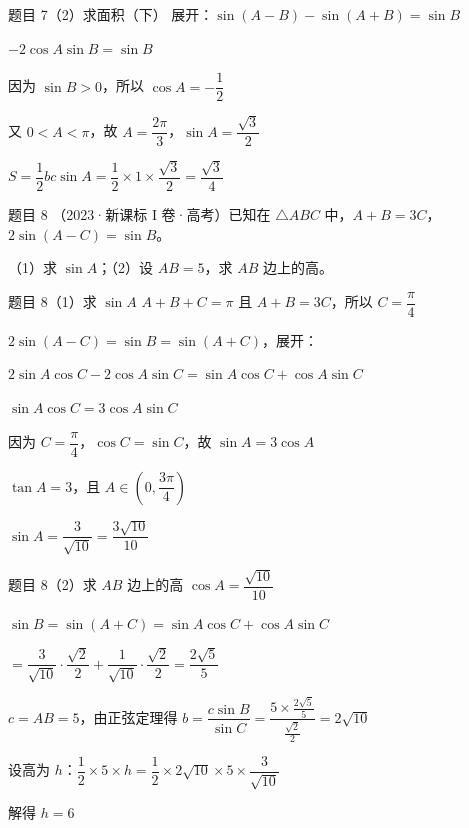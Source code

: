 \documentclass[UTF8]{ctexbeamer}
\begin{document}
	\begin{frame}{题目 7（2）\quad 求面积（下）}
		展开：$\sin(A-B) - \sin(A+B) = \sin B$
		\pause
		
		$-2\cos A\sin B = \sin B$
		\pause
		
		因为 $\sin B > 0$，所以 $\cos A = -\dfrac{1}{2}$
		\pause
		
		又 $0 < A < \pi$，故 $A = \dfrac{2\pi}{3}$，$\sin A = \dfrac{\sqrt{3}}{2}$
		\pause
		
		\vspace{0.3cm}
		$S = \dfrac{1}{2}bc\sin A = \dfrac{1}{2} \times 1 \times \dfrac{\sqrt{3}}{2} = \dfrac{\sqrt{3}}{4}$
	\end{frame}
	
	\begin{frame}{题目 8}
		（2023·新课标 I 卷·高考）已知在 $\triangle ABC$ 中，$A + B = 3C$，$2\sin(A-C) = \sin B$。
		
		\vspace{0.3cm}
		（1）求 $\sin A$；\quad （2）设 $AB = 5$，求 $AB$ 边上的高。
	\end{frame}
	
	\begin{frame}{题目 8（1）\quad 求 $\sin A$}
		$A + B + C = \pi$ 且 $A + B = 3C$，所以 $C = \dfrac{\pi}{4}$
		\pause
		
		$2\sin(A-C) = \sin B = \sin(A+C)$，展开：
		\pause
		
		$2\sin A\cos C - 2\cos A\sin C = \sin A\cos C + \cos A\sin C$
		\pause
		
		$\sin A\cos C = 3\cos A\sin C$
		\pause
		
		因为 $C = \dfrac{\pi}{4}$，$\cos C = \sin C$，故 $\sin A = 3\cos A$
		\pause
		
		$\tan A = 3$，且 $A \in \left(0, \dfrac{3\pi}{4}\right)$
		\pause
		
		$\sin A = \dfrac{3}{\sqrt{10}} = \dfrac{3\sqrt{10}}{10}$
	\end{frame}
	
	\begin{frame}{题目 8（2）\quad 求 $AB$ 边上的高}
		$\cos A = \dfrac{\sqrt{10}}{10}$
		\pause
		
		$\sin B = \sin(A+C) = \sin A\cos C + \cos A\sin C$
		
		$= \dfrac{3}{\sqrt{10}} \cdot \dfrac{\sqrt{2}}{2} + \dfrac{1}{\sqrt{10}} \cdot \dfrac{\sqrt{2}}{2} = \dfrac{2\sqrt{5}}{5}$
		\pause
		
		$c = AB = 5$，由正弦定理得 $b = \dfrac{c\sin B}{\sin C} = \dfrac{5 \times \frac{2\sqrt{5}}{5}}{\frac{\sqrt{2}}{2}} = 2\sqrt{10}$
		\pause
		
		\vspace{0.2cm}
		设高为 $h$：$\dfrac{1}{2} \times 5 \times h = \dfrac{1}{2} \times 2\sqrt{10} \times 5 \times \dfrac{3}{\sqrt{10}}$
		\pause
		
		解得 $h = 6$
	\end{frame}
	
\end{document}
